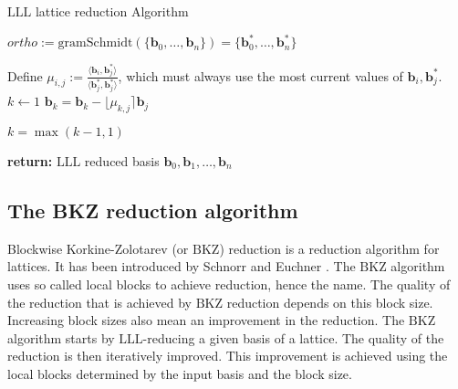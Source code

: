 \begin{algorithm}[H]
    \begin{algorithmic}
        \caption{$\mathrm{LLL}$ lattice reduction Algorithm}
        \label{LLL}
        \State $ortho:=\mathrm{gramSchmidt} (\{\textbf{b}_{0}, \dots, \textbf{b}_{n}\})=\{\textbf{b}_{0}^{*}, \dots, \textbf{b}_{n}^{*}\}$
        \item[] 
        \State Define $\mu_{i,j}:= \frac{\langle \textbf{b}_{i},\textbf{b}_{j}^{*}\rangle}{\langle \textbf{b}_{j}^{*}, \textbf{b}_{j}^{*}\rangle}$, which must always use the most current values of $\textbf{b}_{i}, \textbf{b}_{j}^{*}$.
        \State $k \gets 1$
                {$\textbf{b}_{k}=\textbf{b}_{k}-\lfloor \mu_{k,j}\rceil \textbf{b}_{j}$}
                \item[] 
                \item[] 
                \EndIf
            \EndFor
            \Else{}
                \State $k=\max(k-1,1)$
            \EndIf
        \EndWhile
            \item[] 
            \State \textbf{return:} $\mathrm{LLL}$ reduced basis $\textbf{b}_{0}, \textbf{b}_{1}, \dots, \textbf{b}_{n}$
        \EndProcedure
    \end{algorithmic}
\end{algorithm}


\subsection{The BKZ reduction algorithm}
Blockwise Korkine-Zolotarev (or $\mathrm{BKZ}$) reduction is a reduction algorithm for lattices. It has been introduced by Schnorr and Euchner \cite{Schnorr93latticebasis}. The $\mathrm{BKZ}$ algorithm uses so called local blocks to achieve reduction, hence the name. The quality of the reduction that is achieved by $\mathrm{BKZ}$ reduction depends on this block size. Increasing block sizes also mean an improvement in the reduction. The $\mathrm{BKZ}$ algorithm starts by $\mathrm{LLL}$-reducing a given basis of a lattice. The quality of the reduction is then iteratively improved. This improvement is achieved using the local blocks determined by the input basis and the block size.


